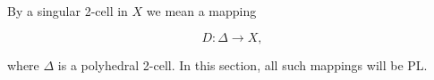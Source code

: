 By a singular 2-cell in $X$ we mean a mapping

$$D: \Delta \rightarrow X,$$

where $\Delta$ is a polyhedral 2-cell. In this section, all such mappings will be PL.
